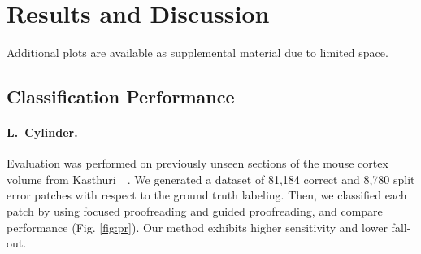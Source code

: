 \section{Results and Discussion}

Additional plots  are available as supplemental material due to limited space. 

\subsection{Classification Performance}

\paragraph{L.~Cylinder.} Evaluation was performed on previously unseen sections of the mouse cortex volume from Kasthuri~\etal~\cite{kasthuri2015saturated}. We generated a dataset of 81,184 correct and 8,780 split error patches with respect to the ground truth labeling. Then, we classified each patch by using focused proofreading and guided proofreading, and compare performance (Fig. \ref{fig:pr}). Our method exhibits higher sensitivity and lower fall-out.%


